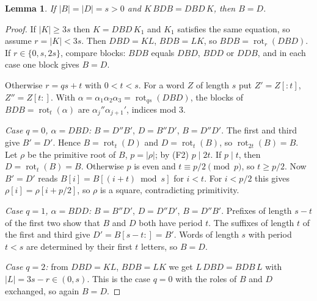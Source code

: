 \documentclass[10pt]{article}
\newtheorem{lemma}[theorem]{Lemma}
\theoremstyle{remark}\newtheorem*{remark}{Remark}
\begin{document}
\begin{lemma}\label{lemC}
If \(|B|=|D|=s>0\) and \(K\,BDB=DBD\,K\), then \(B=D\).
\end{lemma}
\begin{proof}
If \(|K|\ge3s\) then \(K=DBD\,K_1\) and \(K_1\) satisfies the same equation, so assume \(r=|K|<3s\). Then \(DBD=KL\), \(BDB=LK\), so \(BDB=\operatorname{rot}_r(DBD)\). If \(r\in\{0,s,2s\}\), compare blocks: \(BDB\) equals \(DBD\), \(BDD\) or \(DDB\), and in each case one block gives \(B=D\).

Otherwise \(r=qs+t\) with \(0<t<s\). For a word \(Z\) of length \(s\) put \(Z'=Z[{:}t]\), \(Z''=Z[t{:}]\). With \(\alpha=\alpha_1\alpha_2\alpha_3=\operatorname{rot}_{qs}(DBD)\), the blocks of \(BDB=\operatorname{rot}_t(\alpha)\) are \(\alpha_j''\alpha_{j+1}'\), indices mod 3.

\emph{Case \(q=0\), \(\alpha=DBD\):} \(B=D''B'\), \(D=B''D'\), \(B=D''D'\). The first and third give \(B'=D'\). Hence \(B=\operatorname{rot}_t(D)\) and \(D=\operatorname{rot}_t(B)\), so \(\operatorname{rot}_{2t}(B)=B\). Let \(\rho\) be the primitive root of \(B\), \(p=|\rho|\); by (F2) \(p\mid 2t\). If \(p\mid t\), then \(D=\operatorname{rot}_t(B)=B\). Otherwise \(p\) is even and \(t\equiv p/2\pmod p\), so \(t\ge p/2\). Now \(B'=D'\) reads \(B[i]=B[(i+t)\bmod s]\) for \(i<t\). For \(i<p/2\) this gives \(\rho[i]=\rho[i+p/2]\), so \(\rho\) is a square, contradicting primitivity.

\emph{Case \(q=1\), \(\alpha=BDD\):} \(B=B''D'\), \(D=D''D'\), \(B=D''B'\). Prefixes of length \(s-t\) of the first two show that \(B\) and \(D\) both have period \(t\). The suffixes of length \(t\) of the first and third give \(D'=B[s-t{:}]=B'\). Words of length \(s\) with period \(t<s\) are determined by their first \(t\) letters, so \(B=D\).

\emph{Case \(q=2\):} from \(DBD=KL\), \(BDB=LK\) we get \(L\,DBD=BDB\,L\) with \(|L|=3s-r\in(0,s)\). This is the case \(q=0\) with the roles of \(B\) and \(D\) exchanged, so again \(B=D\).
\end{proof}
\end{document}
